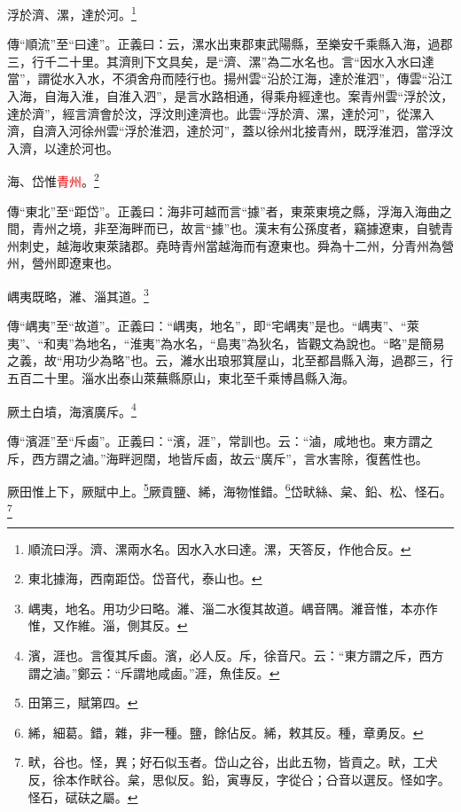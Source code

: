浮於濟、漯，達於河。\footnote{順流曰浮。濟、漯兩水名。因水入水曰達。漯，天答反，作他合反。}

{\noindent\zhuan{}\fzbyks 傳“順流”至“曰達”。正義曰：云，漯水出東郡東武陽縣，至樂安千乘縣入海，過郡三，行千二十里。其濟則下文具矣，是“濟、漯”為二水名也。言“因水入水曰達當”，謂從水入水，不須舍舟而陸行也。揚州雲“沿於江海，達於淮泗”，傳雲“沿江入海，自海入淮，自淮入泗”，是言水路相通，得乘舟經達也。案青州雲“浮於汶，達於濟”，經言濟會於汶，浮汶則達濟也。此雲“浮於濟、漯，達於河”，從漯入濟，自濟入河徐州雲“浮於淮泗，達於河”，蓋以徐州北接青州，既浮淮泗，當浮汶入濟，以達於河也。 \par}

海、岱惟\textcolor{red}{青州}。\footnote{東北據海，西南距岱。岱音代，泰山也。}

{\noindent\zhuan{}\fzbyks 傳“東北”至“距岱”。正義曰：海非可越而言“據”者，東萊東境之縣，浮海入海曲之間，青州之境，非至海畔而已，故言“據”也。漢末有公孫度者，竊據遼東，自號青州刺史，越海收東萊諸郡。堯時青州當越海而有遼東也。舜為十二州，分青州為營州，營州即遼東也。 \par}

嵎夷既略，濰、淄其道。\footnote{嵎夷，地名。用功少曰略。濰、淄二水復其故道。嵎音隅。濰音惟，本亦作惟，又作維。淄，側其反。}

{\noindent\zhuan{}\fzbyks 傳“嵎夷”至“故道”。正義曰：“嵎夷，地名”，即“宅嵎夷”是也。“嵎夷”、“萊夷”、“和夷”為地名，“淮夷”為水名，“島夷”為狄名，皆觀文為說也。“略”是簡易之義，故“用功少為略”也。云，濰水出琅邪箕屋山，北至都昌縣入海，過郡三，行五百二十里。淄水出泰山萊蕪縣原山，東北至千乘博昌縣入海。 \par}

厥土白墳，海濱廣斥。\footnote{濱，涯也。言復其斥鹵。濱，必人反。斥，徐音尺。云：“東方謂之斥，西方謂之滷。”鄭云：“斥謂地咸鹵。”涯，魚佳反。}

{\noindent\zhuan{}\fzbyks 傳“濱涯”至“斥鹵”。正義曰：“濱，涯”，常訓也。云：“滷，咸地也。東方謂之斥，西方謂之滷。”海畔迥闊，地皆斥鹵，故云“廣斥”，言水害除，復舊性也。 \par}

厥田惟上下，厥賦中上。\footnote{田第三，賦第四。}厥貢鹽、絺，海物惟錯。\footnote{絺，細葛。錯，雜，非一種。鹽，餘佔反。絺，敕其反。種，章勇反。}岱畎絲、枲、鉛、松、怪石。\footnote{畎，谷也。怪，異；好石似玉者。岱山之谷，出此五物，皆貢之。畎，工犬反，徐本作畎谷。枲，思似反。鉛，寅專反，字從㕣；㕣音以選反。怪如字。怪石，碔砆之屬。}

